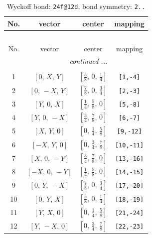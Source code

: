 \documentclass[fleqn,8pt]{jsarticle}
\begin{document}
\renewcommand{\arraystretch}{1.2}
\begin{longtable}{cccc}
\caption{Wyckoff bond: {\tt 24f@12d}, bond symmetry: {\tt 2..}}
 \\
 \hline \hline
No. & vector & center & mapping \\ \hline \endfirsthead

\multicolumn{3}{l}{\tablename\ \thetable{}} \\
 \hline \hline
No. & vector & center & mapping \\ \hline \endhead

 \hline \hline
\multicolumn{3}{r}{\footnotesize\it continued ...} \\ \endfoot

 \hline \hline
\multicolumn{3}{r}{} \\ \endlastfoot

1 & $\left[ 0,\, X,\, Y \right]$ & $\left[ \frac{5}{8},\, 0,\, \frac{1}{4} \right]$ & {\tt [1,-4]} \\ \hline
2 & $\left[ 0,\, - X,\, Y \right]$ & $\left[ \frac{7}{8},\, 0,\, \frac{3}{4} \right]$ & {\tt [2,-3]} \\ \hline
3 & $\left[ Y,\, 0,\, X \right]$ & $\left[ \frac{1}{4},\, \frac{5}{8},\, 0 \right]$ & {\tt [5,-8]} \\ \hline
4 & $\left[ Y,\, 0,\, - X \right]$ & $\left[ \frac{3}{4},\, \frac{7}{8},\, 0 \right]$ & {\tt [6,-7]} \\ \hline
5 & $\left[ X,\, Y,\, 0 \right]$ & $\left[ 0,\, \frac{1}{4},\, \frac{5}{8} \right]$ & {\tt [9,-12]} \\ \hline
6 & $\left[ - X,\, Y,\, 0 \right]$ & $\left[ 0,\, \frac{3}{4},\, \frac{7}{8} \right]$ & {\tt [10,-11]} \\ \hline
7 & $\left[ X,\, 0,\, - Y \right]$ & $\left[ \frac{3}{4},\, \frac{7}{8},\, 0 \right]$ & {\tt [13,-16]} \\ \hline
8 & $\left[ - X,\, 0,\, - Y \right]$ & $\left[ \frac{1}{4},\, \frac{5}{8},\, 0 \right]$ & {\tt [14,-15]} \\ \hline
9 & $\left[ 0,\, Y,\, - X \right]$ & $\left[ \frac{7}{8},\, 0,\, \frac{3}{4} \right]$ & {\tt [17,-20]} \\ \hline
10 & $\left[ 0,\, Y,\, X \right]$ & $\left[ \frac{5}{8},\, 0,\, \frac{1}{4} \right]$ & {\tt [18,-19]} \\ \hline
11 & $\left[ Y,\, X,\, 0 \right]$ & $\left[ 0,\, \frac{1}{4},\, \frac{5}{8} \right]$ & {\tt [21,-24]} \\ \hline
12 & $\left[ Y,\, - X,\, 0 \right]$ & $\left[ 0,\, \frac{3}{4},\, \frac{7}{8} \right]$ & {\tt [22,-23]} \\
\end{longtable}
\end{document}
